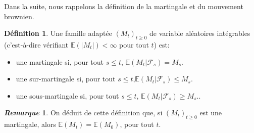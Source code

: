 \documentclass[12pt,a4paper,twoside]{book}%
\theoremstyle{definition}
\newtheorem{dfn}{Définition}[section]
\newtheorem{rem}{\textit{Remarque}}[section]
\numberwithin{equation}{section}
\begin{document}
Dans la suite, nous rappelons la définition de la martingale et du mouvement brownien.
\begin{dfn}
Une famille adaptée $(M_t)_{t\geq0}$ de variable aléatoires intégrables (c'est-à-dire vérifiant $\mathbb{E}(|M_t|)<\infty$ pour tout $t$) est:
\begin{itemize}
	\item une martingale si, pour tout $s\leq t$, $\mathbb{E}(M_t|\mathcal{F}_s)=M_s$.
	\item une sur-martingale si, pour tout $s\leq t$,$\mathbb{E}(M_t|\mathcal{F}_s)\leq M_s.$
	\item une sous-martingale si, pour tout $s\leq t$, $\mathbb{E}(M_t|\mathcal{F}_s)\geq M_s.$. 
\end{itemize}
\begin{rem}
	On déduit de cette définition que, si $(M_t)_{t\geq0}$ est une martingale, alors $\mathbb{E}(M_t)=\mathbb{E}(M_0)$, pour tout $t$.
\end{rem}
\end{dfn}
\end{document}
